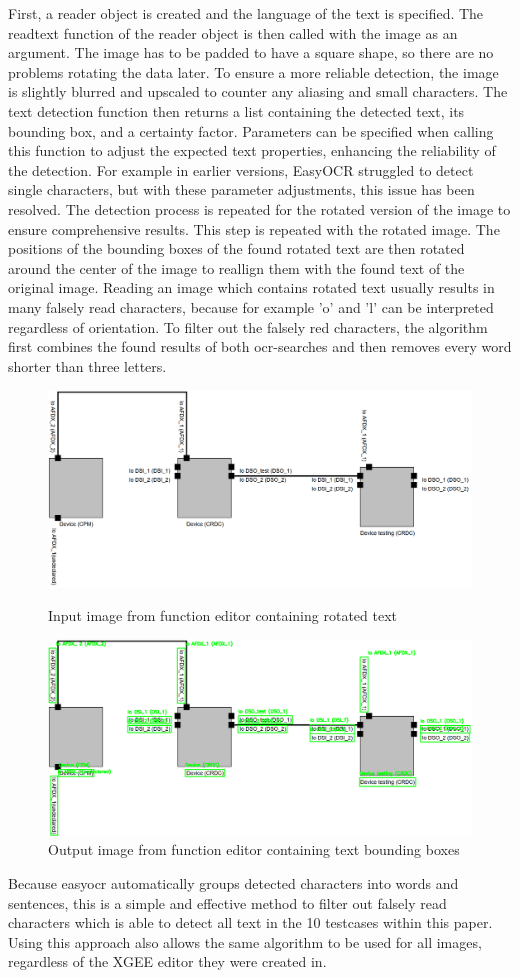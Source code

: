 First, a reader object is created and the language of the text is specified. The readtext function of the reader object is then called with the image as an argument. The image has to be padded to have a square shape, so there are no problems rotating the data later. To ensure a more reliable detection, the image is slightly blurred and upscaled to counter any aliasing and small characters. The text detection function then returns a list containing the detected text, its bounding box, and a certainty factor. Parameters can be specified when calling this function to adjust the expected text properties, enhancing the reliability of the detection. For example in earlier versions, EasyOCR struggled to detect single characters, but with these parameter adjustments, this issue has been resolved. The detection process is repeated for the rotated version of the image to ensure comprehensive results. This step is repeated with the rotated image. The positions of the bounding boxes of the found rotated text are then rotated around the center of the image to reallign them with the found text of the original image. Reading an image which contains rotated text usually results in many falsely read characters, because for example 'o' and 'l' can be interpreted regardless of orientation. To filter out the falsely red characters, the algorithm first combines the found results of both ocr-searches and then removes every word shorter than three letters.
\begin{figure}[htb]
    \centering
    \includegraphics[width=0.8\linewidth]{Pictures/text_before.png}
    \caption{Input image from function editor containing rotated text}
    \label{fig_text_before}

    \centering
    \includegraphics[width=0.8\linewidth]{Pictures/text_after.png}
    \caption{Output image from function editor containing text bounding boxes}
    \label{fig_text_after}
\end{figure}
Because easyocr automatically groups detected characters into words and sentences, this is a simple and effective method to filter out falsely read characters which is able to detect all text in the 10 testcases within this paper. Using this approach also allows the same algorithm to be used for all images, regardless of the XGEE editor they were created in.
